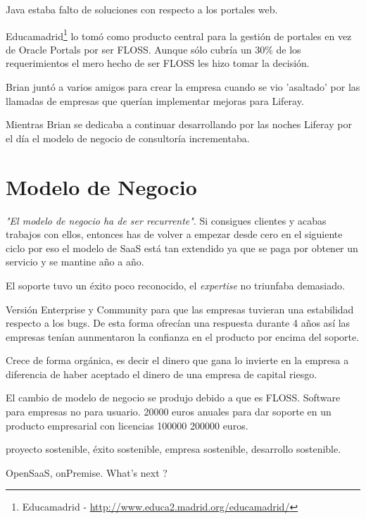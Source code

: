 \documentclass[11pt]{scrartcl}
\begin{document}
\par Java estaba falto de soluciones con respecto a los portales web.

\par Educamadrid\footnote{Educamadrid - \url{http://www.educa2.madrid.org/educamadrid/}} lo tom\'o como producto central para la gesti\'on de portales en vez de Oracle Portals por ser FLOSS. Aunque s\'olo cubr\'ia un 30\% de los requerimientos el mero hecho de ser FLOSS les hizo tomar la decisi\'on.

\par Brian junt\'o a varios amigos para crear la empresa cuando se vio 'asaltado' por las llamadas de empresas que quer\'ian implementar mejoras para Liferay.

\par Mientras Brian se dedicaba a continuar desarrollando por las noches Liferay por el d\'ia el modelo de negocio de consultor\'ia incrementaba.


\section{Modelo de Negocio}
\label{sec:business-model}

\par \emph{"El modelo de negocio ha de ser recurrente"}. Si consigues clientes y acabas trabajos con ellos, entonces has de volver a empezar desde cero en el siguiente ciclo por eso el modelo de SaaS está tan extendido ya que se paga por obtener un servicio y se mantine a\~no a a\~no.

\par El soporte tuvo un \'exito poco reconocido, el \emph{expertise} no triunfaba demasiado.

\par Versi\'on Enterprise y Community para que las empresas tuvieran una estabilidad respecto a los bugs. De esta forma ofrec\'ian una respuesta durante 4 a\~nos as\'i las empresas ten\'ian aunmentaron la confianza en el producto por encima del soporte.

\par Crece de forma org\'anica, es decir el dinero que gana lo invierte en la empresa a diferencia de haber aceptado el dinero de una empresa de capital riesgo.

\par El cambio de modelo de negocio se produjo debido a que es FLOSS. Software para empresas no para usuario. 20000 euros anuales para dar soporte en un producto empresarial con licencias 100000 200000 euros.

\par proyecto sostenible, \'exito sostenible, empresa sostenible, desarrollo sostenible.

\par OpenSaaS, onPremise. What's next ?

\end{document}
